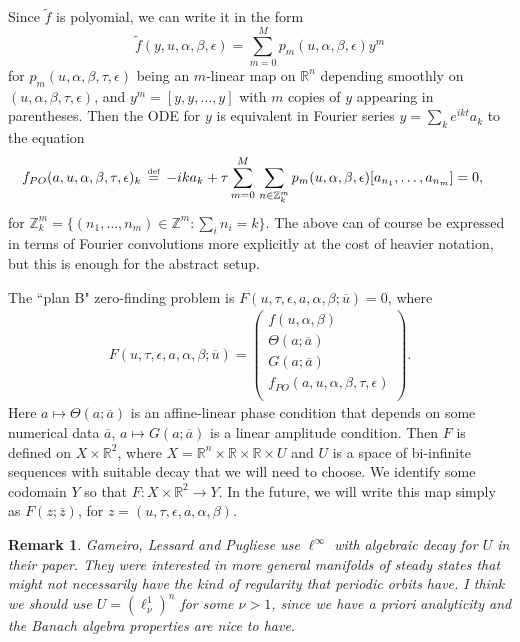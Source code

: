 \documentclass[10pt]{article}
\newcommand{\bydef}{\,\stackrel{\mbox{\tiny\textnormal{\raisebox{0ex}[0ex][0ex]{def}}}}{=}\,}
\newcommand{\R}{\mathbb{R}}
\newcommand{\Z}{\mathbb{Z}}
\newtheorem{remark}[rem]{Remark}
\begin{document}
Since $\tilde f$ is polyomial, we can write it in the form
$$\tilde f(y,u,\alpha,\beta,\epsilon) = \sum_{m=0}^Mp_m(u,\alpha,\beta,\epsilon)y^m$$
for $p_m(u,\alpha,\beta,\tau,\epsilon)$ being an $m$-linear map on $\R^n$ depending smoothly on $(u,\alpha,\beta,\tau,\epsilon)$, and $y^m=[y,y,\dots,y]$ with $m$ copies of $y$ appearing in parentheses. Then the ODE for $y$ is equivalent in Fourier series $y=\sum_k e^{ikt}a_k$ to the equation
\begin{align*}
f_{PO}(a,u,\alpha,\beta,\tau,\epsilon)_k&\bydef-ika_k + \tau\sum_{m=0}^M\hspace{0.5mm}\sum_{n\in \Z^m_k}p_m(u,\alpha,\beta,\epsilon)[a_{n_1},\dots,a_{n_m}]=0,
\end{align*}
for $\Z_k^m=\{(n_1,\dots,n_m)\in\Z^m : \sum_i n_i = k\}.$ The above can of course be expressed in terms of Fourier convolutions more explicitly at the cost of heavier notation, but this is enough for the abstract setup.

The ``plan B" zero-finding problem is $F(u,\tau,\epsilon,a,\alpha,\beta ; \overline u)=0$, where
\begin{align}\label{zfp-B}
F(u,\tau,\epsilon,a,\alpha,\beta; \overline u)=\left(\begin{array}{c}f(u,\alpha,\beta) \\ \Theta(a;\overline a) \\ G(a;\overline a) \\ f_{PO}(a,u,\alpha,\beta,\tau,\epsilon) \\  \end{array}\right).
\end{align}
Here $a\mapsto\Theta(a;\overline a)$ is an affine-linear phase condition that depends on some numerical data $\overline a$, $a\mapsto G(a;\overline a)$ is a linear amplitude condition. Then $F$ is defined on $X\times\R^2$, where $X=\R^n\times\R\times\R\times U$ and $U$ is a space of bi-infinite sequences with suitable decay that we will need to choose. We identify some codomain $Y$ so that $F:X\times\R^2\rightarrow Y$. In the future, we will write this map simply as $F(z;\overline z)$, for $z=(u,\tau,\epsilon,a,\alpha,\beta)$.

\begin{remark}
Gameiro, Lessard and Pugliese use $\ell^\infty$ with algebraic decay for $U$ in their paper. They were interested in more general manifolds of steady states that might not necessarily have the kind of regularity that periodic orbits have. I think we should use $U=(\ell_\nu^1)^n$ for some $\nu>1$, since we have a priori analyticity and the Banach algebra properties are nice to have.
\end{remark}
\end{document}
